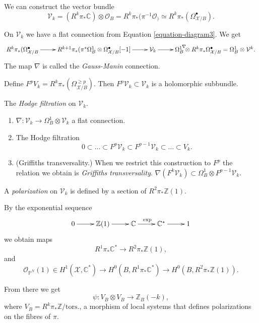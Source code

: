 We can construct the vector bundle
$$
\mathcal{V}_k=(R^k\pi_*\mathbb{C})
\otimes\mathcal{O}_B
=R^k\pi_*(\pi^{-1}\mathcal{O}_\Big)
\simeq
R^k\pi_*(\Omega^\bullet_{\mathcal{X}/B}).
$$

On $\mathcal{V}_k$ we have a flat connection
from Equation \ref{equation-diagram3}.
We get
$$
\xymatrix{
  R^k\pi_*(\Omega^\bullet_{\mathcal{X}/B}
  \ar[r]
&R^{k+1}\pi_*(\pi^*\Omega^1_B \otimes
\Omega^\bullet_{\mathcal{X}/B}[-1]\ar[r]
&\mathcal{V}_k\ar[r]^{\nabla}
&\Omega_B^1 \otimes
R^k\pi_*\Omega^\bullet_{\mathcal{X}/B}
=\Omega^1_B \otimes \mathcal{V}^k.
}
$$
The map $\nabla$ is called the {\it
Gauss-Manin} connection.

\medskip\noindent
Define
$F^pV_k=R^k\pi_*(\Omega_{\mathcal{X}/B}^{\geq
p})$.
Then $F^p\mathcal{V}_k \subset \mathcal{V}_k$
is a holomorphic subbundle.

The {\it Hodge filtration} on
$\mathcal{V}_k$.
\begin{enumerate}
\item $\nabla:\mathcal{V}_k \to \Omega_B^1
\otimes \mathcal{V}_k$
a flat connection.

\item The Hodge filtration
$$
0 \subset … \subset F^p\mathcal{V}_k
\subset F^{p-1}\mathcal{V}_k
\subset…\subset V_k.
$$
\item (Griffiths transversality.)
When we restrict this construction to $F^p$
the relation we obtain is {\it Griffiths
transversality}.
$\nabla(F^k\mathcal{V}_k) \subset
\Omega^1_B \otimes F^{p-1}\mathcal{V}_k$.
\end{enumerate}

\begin{definition}
\label{definition-polarization-on-vk}
A {\it polarization} on $\mathcal{V}_k$
is defined by a section of
$R^2\pi_*\mathbb{Z}(1)$.
\end{definition}

\noindent
By the exponential sequence
$$
\xymatrix{
0\ar[r]
&\mathbb{Z}(1)\ar[r]
&\mathbb{C}\ar[r]^{\text{exp}}
&\mathbb{C}^*\ar[r]
&1
}
$$
we obtain maps
$$
R^1\pi_*\mathbb{C}^*\to
R^2\pi_*\mathbb{Z}(1),
$$
and
$$
\mathcal{O}_{\mathbb{P}^N}(1) \in
H^1(\mathcal{X},\mathbb{C}^*)
\to H^0(B,R^1\pi_*\mathbb{C}^*)
\to H^0(B,R^2\pi_*\mathbb{Z}(1)).
$$

From there we get
$$
\psi:V_B \otimes V_B \to \mathbb{Z}_B(-k),
$$
where $V_B=R^k\pi_*\mathbb{Z}/\text{tors.}$,
a morphism of local systems that defines
polarizations on the fibres of $\pi$.

